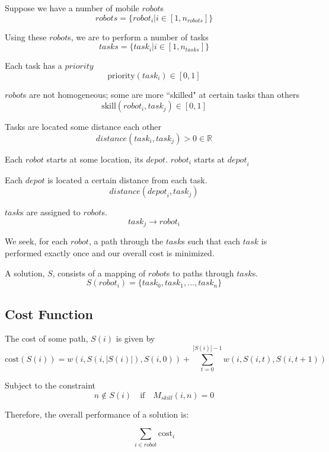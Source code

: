 \documentclass[a4paper]{article}
\begin{document}
Suppose we have a number of mobile $\mathit{robot}$s
$$\mathit{robots} = \{ \mathit{robot}_i | i \in [1, n_\mathit{robots}] \}$$

Using these $\mathit{robot}$s, we are to perform a number of tasks
$$\mathit{tasks} = \{ \mathit{task}_i | i \in [1, n_\mathit{tasks}] \}$$

Each task has a $\mathit{priority}$
$$\text{priority}(\mathit{task}_i) \in [0 ,1]$$

$\mathit{robot}$s are not homogeneous; some are more ``skilled" at certain tasks than others
$$\text{skill}(\mathit{robot}_i, \mathit{task}_j) \in [0 ,1]$$

Tasks are located some distance each other
$$\mathit{distance}(\mathit{task}_i, \mathit{task}_j) > 0 \in \mathbb{R}$$

Each $\mathit{robot}$ starts at some location, its $\mathit{depot}$. $\mathit{robot}_i$ starts at $\mathit{depot}_i$

Each $\textit{depot}$ is located a certain distance from each task.
$$\mathit{distance}(\mathit{depot}_i, \mathit{task}_j)$$

$\mathit{task}$s are assigned to $\mathit{robot}$s.
$$\mathit{task}_j \rightarrow \mathit{robot}_i$$

We seek, for each $\mathit{robot}$, a path through the $\mathit{task}$s such that each $\mathit{task}$ is performed exactly once and our overall cost is minimized.

A solution, $S$, consists of a mapping of $\mathit{robot}$s to paths through $\mathit{task}$s.
$$S(\mathit{robot}_i) = \{\mathit{task}_0, \mathit{task}_1, ..., \mathit{task}_n\}$$



\subsection{Cost Function}



The cost of some path, $S(i)$ is given by
$$
\text{cost}(S(i)) = w(i, S(i,|S(i)|), S(i,0)) + \sum_{t = 0}^{|S(i)|-1} w(i, S(i,t), S(i,t+1))
$$

Subject to the constraint
$$
n \notin S(i) \quad \text{if} \quad M_{skill}(i, n) = 0
$$

Therefore, the overall performance of a solution is:

$$
\sum_{i \in \mathit{robot}} \text{cost}_i
$$
\end{document}
